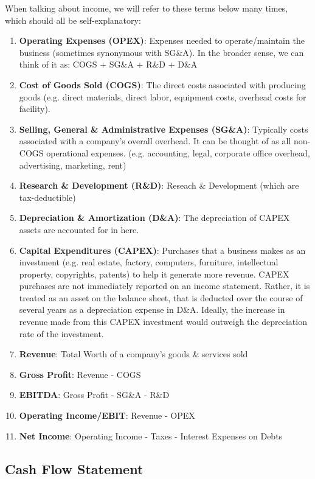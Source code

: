 \documentclass{article}
\begin{document}
    When talking about income, we will refer to these terms below many times, which should all be self-explanatory:
    \begin{enumerate}
      \item \textbf{Operating Expenses (OPEX)}: Expenses needed to operate/maintain the business (sometimes synonymous with SG\&A). In the broader sense, we can think of it as: COGS + SG\&A + R\&D + D\&A
      \item \textbf{Cost of Goods Sold (COGS)}: The direct costs associated with producing goods (e.g. direct materials, direct labor, equipment costs, overhead costs for facility).
      \item \textbf{Selling, General \& Administrative Expenses (SG\&A)}: Typically costs associated with a company's overall overhead. It can be thought of as all non-COGS operational expenses. (e.g. accounting, legal, corporate office overhead, advertising, marketing, rent)
      \item \textbf{Research \& Development (R\&D)}: Reseach \& Development (which are tax-deductible)
      \item \textbf{Depreciation \& Amortization (D\&A)}: The depreciation of CAPEX assets are accounted for in here.
      \item \textbf{Capital Expenditures (CAPEX)}: Purchases that a business makes as an investment (e.g. real estate, factory, computers, furniture, intellectual property, copyrights, patents) to help it generate more revenue. CAPEX purchases are not immediately reported on an income statement. Rather, it is treated as an asset on the balance sheet, that is deducted over the course of several years as a depreciation expense in D\&A. Ideally, the increase in revenue made from this CAPEX investment would outweigh the depreciation rate of the investment.
      \item \textbf{Revenue}:  Total Worth of a company's goods \& services sold
      \item \textbf{Gross Profit}: Revenue - COGS
      \item \textbf{EBITDA}: Gross Profit - SG\&A - R\&D
      \item \textbf{Operating Income/EBIT}: Revenue - OPEX
      \item \textbf{Net Income}: Operating Income - Taxes - Interest Expenses on Debts
    \end{enumerate}

  \subsection{Cash Flow Statement}
\end{document}
